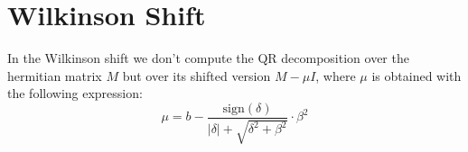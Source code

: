 \documentclass{scrartcl}
\begin{document}
%
%
%
%
%
%
%
%
%
%
%


\section{Wilkinson Shift}
In the Wilkinson shift we don't compute the QR decomposition over the hermitian matrix $M$ but over its shifted version $M - \mu I$, where $\mu$ is obtained with the following expression:
\[
    \mu = b - \frac{\text{sign}(\delta)}{|\delta| + \sqrt{\delta^2 + \beta^2}} \cdot \beta^2
\]
\end{document}
